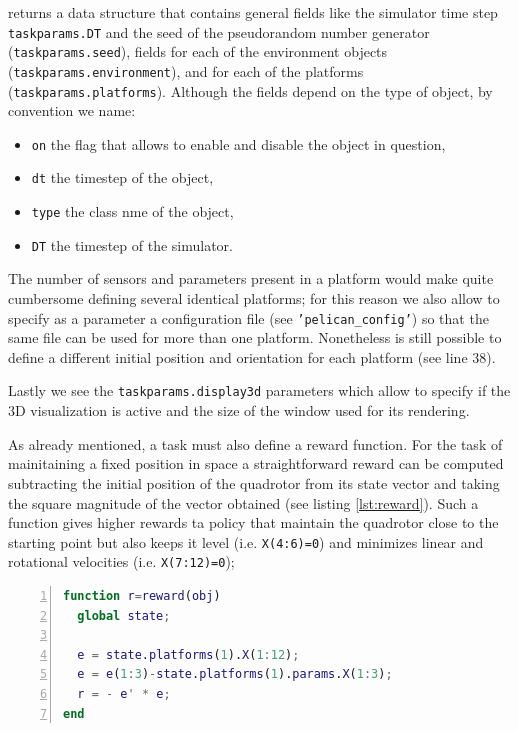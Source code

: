 \documentclass[a4paper,11pt]{report}
\begin{document}
returns a data structure that contains general fields like the simulator time step \texttt{taskparams.DT} and the seed of the pseudorandom number generator (\texttt{taskparams.seed}), fields for each of the environment objects (\texttt{taskparams.environment}), and for each of the platforms (\texttt{taskparams.platforms}). Although the fields depend on the type of object, by convention we name:
\begin{itemize}
\item \texttt{on} the flag that allows to enable and disable the object in question,
\item \texttt{dt} the timestep of the object,
\item \texttt{type} the class nme of the object,
\item \texttt{DT} the timestep of the simulator.
\end{itemize}
The number of sensors and parameters present in a platform would make quite cumbersome defining several identical platforms; for this reason we also allow to specify as a parameter a configuration file (see \texttt{'pelican\_config'}) so that the same file can be used for more than one platform. Nonetheless is still possible to define a different initial position and orientation for each platform (see line 38).

Lastly we see the \texttt{taskparams.display3d} parameters which allow to specify if the 3D visualization is active and the size of the window used for its rendering. 

As already mentioned, a task must also define a reward function. For the task of mainitaining a fixed position in space a straightforward reward can be computed subtracting the initial position of the quadrotor from its state vector and taking the square magnitude of the vector obtained (see listing \ref{lst:reward}). 
Such a function gives higher rewards ta policy that maintain the quadrotor close to the starting point but also keeps it level (i.e. \texttt{X(4:6)=0}) and minimizes linear and rotational velocities (i.e. \texttt{X(7:12)=0});

\begin{lstlisting}[float=ht!bp,caption=KeepSpot reward() method,language=Matlab,frame=lines,label=lst:reward,numbers=left,basicstyle=\small]
function r=reward(obj)
  global state;

  e = state.platforms(1).X(1:12);
  e = e(1:3)-state.platforms(1).params.X(1:3);
  r = - e' * e; 
end
\end{lstlisting}
\end{document}
